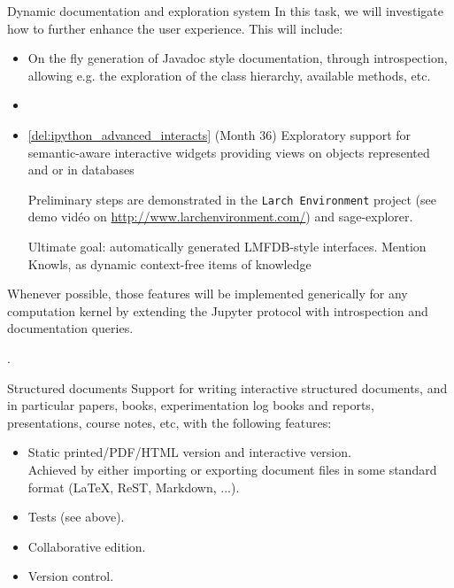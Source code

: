\begin{Workpackage}{\thewpno}
\begin{task}{Dynamic documentation and exploration system}
  In this task, we will investigate how to further enhance the user
  experience. This will include:

  \begin{itemize}
  \item On the fly generation of Javadoc style documentation, through
    introspection, allowing e.g. the exploration of the class
    hierarchy, available methods, etc.
  \item {}
  \item \ref{del:ipython_advanced_interacts} (Month 36) Exploratory
    support for semantic-aware interactive widgets providing views on
    objects represented and or in databases

    Preliminary steps are demonstrated in the \texttt{Larch
      Environment} project (see demo vidéo on
    \url{http://www.larchenvironment.com/}) and sage-explorer.

    Ultimate goal: automatically generated LMFDB-style interfaces.
    Mention Knowls, as dynamic context-free items of knowledge
  \end{itemize}




  Whenever possible, those features will be implemented generically
  for any computation kernel by extending the Jupyter protocol with
  introspection and documentation queries.


  \item .
  \item     %

\end{task}

\begin{task}{Structured documents}
  Support for writing interactive structured documents, and in
  particular papers, books, experimentation log books and reports,
  presentations, course notes, etc, with the following features:
  \begin{itemize}
  \item Static printed/PDF/HTML version and interactive version.\\
    Achieved by either importing or exporting document files in some
    standard format (LaTeX, ReST, Markdown, ...).
  \item Tests (see above).
  \item Collaborative edition.
  \item Version control.
  \end{itemize}
\end{task}



\end{Workpackage}
